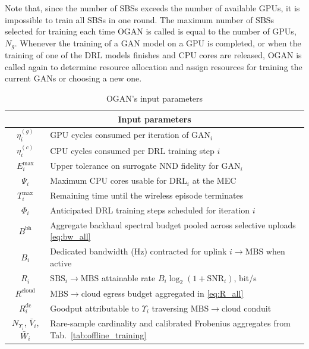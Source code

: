 \documentclass[letterpaper%
, twoside%
, 12pt%
,memoire%
, english%
,creativecommons,hyperref, withAlgo2e %
]{thETS}
\numberwithin{algorithm}{chapter}
\begin{document}
Note that, since the number of SBSs exceeds the number of available GPUs, it is impossible to train all SBSs in one round. The maximum number of SBSs selected for training each time OGAN is called is equal to the number of GPUs, $N_g$. Whenever the training of a GAN model on a GPU is completed, or when the training of one of the DRL models finishes and CPU cores are released, OGAN is called again to determine resource allocation and assign resources for training the current GANs or choosing a new one.










\begin{table}[htp]
\centering
\caption{OGAN's input parameters}
\label{tab:ogan_inputs}
\renewcommand{\arraystretch}{1.5} %
\begin{tabular}{|c|l|}
\hline
\multicolumn{2}{|c|}{\textbf{Input parameters}} \\
\hline
$\eta_i^{(g)}$ & GPU cycles consumed per iteration of $\mathrm{GAN}_i$ \\
\hline
$\eta_i^{(c)}$ & CPU cycles consumed per DRL training step $i$ \\
\hline
$E_i^{\max}$ & Upper tolerance on surrogate NND fidelity for $\mathrm{GAN}_i$ \\
\hline
$\Psi_i$ & Maximum CPU cores usable for $\mathrm{DRL}_i$ at the MEC \\
\hline
$T_i^{\max}$ & Remaining time until the wireless episode terminates \\
\hline
$\Phi_i$ & Anticipated DRL training steps scheduled for iteration $i$ \\
\hline
$B^{\mathrm{bh}}$ & Aggregate backhaul spectral budget pooled across selective uploads \eqref{eq:bw_all} \\
\hline
$B_i$ & Dedicated bandwidth (Hz) contracted for uplink \(i\to\mathrm{MBS}\) when active \\
\hline
$R_i$ & \(\mathrm{SBS}_i\to\mathrm{MBS}\) attainable rate \(B_i\log_2(1+\mathrm{SNR}_i)\), bit/s \\
\hline
$R^{\mathrm{cloud}}$ & \(\mathrm{MBS}\to\)cloud egress budget aggregated in \eqref{eq:R_all} \\
\hline
$R_i^{\mathrm{dc}}$ & Goodput attributable to \(\Upsilon_i\) traversing \(\mathrm{MBS}\to\)cloud conduit \\
\hline
$N_{\Upsilon_i}$, $\bar{V}_i$, $\bar{W}_i$ & Rare-sample cardinality and calibrated Frobenius aggregates from Tab.~\ref{tab:offline_training} \\

\end{tabular}
\end{table}
\end{document}
